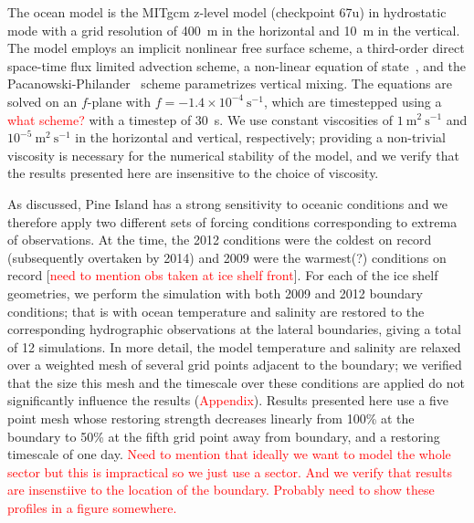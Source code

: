 \documentclass[draft]{agujournal2019}
\newcommand{\red}[1]{\textcolor{red}{#1}}
\begin{document}
The ocean model is the MITgcm z-level model (checkpoint 67u) in hydrostatic mode with a grid resolution of 400~m in the horizontal and 10~m in the vertical. The model employs an implicit nonlinear free surface scheme, a third-order direct space-time flux limited advection scheme, a non-linear equation of state~, and the Pacanowski-Philander~\cite{Pacanowski1981JPhysOcean} scheme parametrizes vertical mixing. The equations are solved on an $f$-plane with $f = -1.4\times10^{-4}~\text{s}^{-1}$, which are timestepped using a \red{what scheme?} with a timestep of 30~s. We use constant viscosities of $1~\text{m}^2~\text{s}^{-1}$ and $10^{-5}~\text{m}^2~\text{s}^{-1}$ in the horizontal and vertical, respectively; providing a non-trivial viscosity is necessary for the numerical stability of the model, and we verify that the results presented here are insensitive to the choice of viscosity.

As discussed, Pine Island has a strong sensitivity to oceanic conditions and we therefore apply two different sets of forcing conditions corresponding to extrema of observations. At the time, the 2012 conditions were the coldest on record (subsequently overtaken by 2014) and 2009 were the warmest(?) conditions on record [\red{need to mention obs taken at ice shelf front}]. For each of the ice shelf geometries, we perform the simulation with both 2009 and 2012 boundary conditions; that is with ocean temperature and salinity are restored to the corresponding hydrographic observations at the lateral boundaries, giving a total of 12 simulations. In more detail, the model temperature and salinity are relaxed over a weighted mesh of several grid points adjacent to the boundary; we verified that the size this mesh and the timescale over these conditions are applied do not significantly influence the results (\red{Appendix}). Results presented here use a five point mesh whose restoring strength decreases linearly from 100\% at the boundary to 50\% at the fifth grid point away from boundary, and a restoring timescale of one day. \red{Need to mention that ideally we want to model the whole sector but this is impractical so we just use a sector. And we verify that results are insenstiive to the location of the boundary. Probably need to show these profiles in a figure somewhere.}
\end{document}
